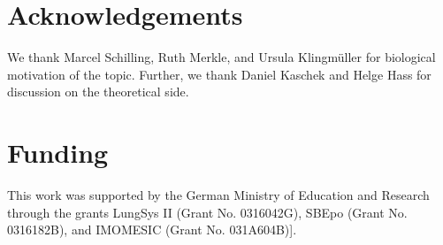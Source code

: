 \documentclass{bioinfo}
\begin{document}
\section*{Acknowledgements}

We thank Marcel Schilling, Ruth Merkle, and Ursula Klingm{\"u}ller for biological motivation of the topic.
Further, we thank Daniel Kaschek and Helge Hass for discussion on the theoretical side.

\section*{Funding}

This work was supported by the German Ministry of Education and Research through the grants LungSys II (Grant No. 0316042G), SBEpo (Grant No. 0316182B), and IMOMESIC (Grant No. 031A604B)]. 


%
%
%
% 

% 


\end{document}
